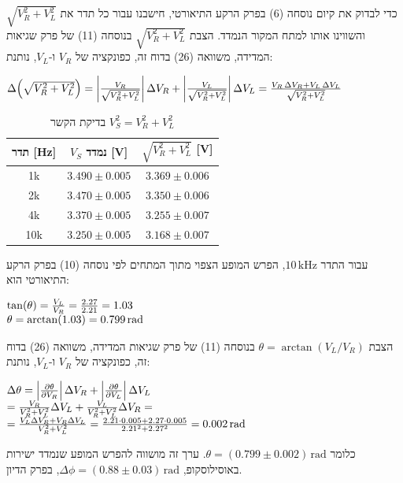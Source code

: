 \documentclass[14pt]{extarticle}
\makeatletter
\newenvironment{lefteqs}{%
    \begin{english}%
    \begin{flushleft}%
    \renewcommand{\arraystretch}{1.3}%
    $\begin{array}{@{}l@{}}%
}{%
    \end{array}$%
    \end{flushleft}%
    \end{english}%
}
\makeatother
\begin{document}
כדי לבדוק את קיום נוסחה (6) בפרק הרקע התיאורטי, חישבנו עבור כל תדר את $\sqrt{V_R^2 + V_L^2}$ והשווינו אותו למתח המקור הנמדד. הצבת $\sqrt{V_R^2 + V_L^2}$ בנוסחה (11) של פרק שגיאות המדידה, משוואה (26) בדוח זה, כפונקציה של $V_R$ ו-$V_L$, נותנת:
\begin{lefteqs}
    \Delta\!\left(\sqrt{V_R^2 + V_L^2}\right) = \left|\frac{V_R}{\sqrt{V_R^2 + V_L^2}}\right|\Delta V_R + \left|\frac{V_L}{\sqrt{V_R^2 + V_L^2}}\right|\Delta V_L = \frac{V_R \, \Delta V_R + V_L \, \Delta V_L}{\sqrt{V_R^2 + V_L^2}}
\end{lefteqs}
\begin{table}[H]
    \centering
    \begin{tabular}{|c|c|c|}
        \hline
        תדר [Hz] & $V_S$ נמדד [V] & $\sqrt{V_R^2 + V_L^2}$ [V] \\
        \hline
        1k & $3.490 \pm 0.005$ & $3.369 \pm 0.006$ \\
        2k & $3.470 \pm 0.005$ & $3.350 \pm 0.006$ \\
        4k & $3.370 \pm 0.005$ & $3.255 \pm 0.007$ \\
        10k & $3.250 \pm 0.005$ & $3.168 \pm 0.007$ \\
        \hline
    \end{tabular}
    \caption{בדיקת הקשר $V_S^2 = V_R^2 + V_L^2$}
\end{table}

עבור התדר $10\,\text{kHz}$, הפרש המופע הצפוי מתוך המתחים לפי נוסחה (10) בפרק הרקע התיאורטי הוא:
\begin{lefteqs}
    \tan(\theta) = \frac{V_L}{V_R} = \frac{2.27}{2.21} = 1.03 \\
    \theta = \arctan(1.03) = 0.799\,\text{rad}
\end{lefteqs}
הצבת $\theta = \arctan(V_L / V_R)$ בנוסחה (11) של פרק שגיאות המדידה, משוואה (26) בדוח זה, כפונקציה של $V_R$ ו-$V_L$, נותנת:
\begin{lefteqs}
    \Delta\theta = \left|\frac{\partial \theta}{\partial V_R}\right|\Delta V_R + \left|\frac{\partial \theta}{\partial V_L}\right|\Delta V_L \\
    = \frac{V_R}{V_R^2 + V_L^2}\Delta V_L + \frac{V_L}{V_R^2 + V_L^2}\Delta V_R = \\
    = \frac{V_L \Delta V_R + V_R \Delta V_L}{V_R^2 + V_L^2} = \frac{2.21 \cdot 0.005 + 2.27 \cdot 0.005}{2.21^2 + 2.27^2} = 0.002\,\text{rad}
\end{lefteqs}
כלומר $\theta = (0.799 \pm 0.002)\,\text{rad}$.
ערך זה מושווה להפרש המופע שנמדד ישירות באוסילוסקופ, $\Delta\phi = (0.88 \pm 0.03)\,\text{rad}$, בפרק הדיון.
\end{document}
